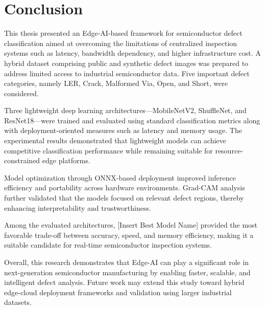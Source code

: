 \chapter{Conclusion}
This thesis presented an Edge-AI-based framework for semiconductor defect classification aimed at overcoming the limitations of centralized inspection systems such as latency, bandwidth dependency, and higher infrastructure cost. A hybrid dataset comprising public and synthetic defect images was prepared to address limited access to industrial semiconductor data. Five important defect categories, namely LER, Crack, Malformed Via, Open, and Short, were considered.

Three lightweight deep learning architectures—MobileNetV2, ShuffleNet, and ResNet18—were trained and evaluated using standard classification metrics along with deployment-oriented measures such as latency and memory usage. The experimental results demonstrated that lightweight models can achieve competitive classification performance while remaining suitable for resource-constrained edge platforms.

Model optimization through ONNX-based deployment improved inference efficiency and portability across hardware environments. Grad-CAM analysis further validated that the models focused on relevant defect regions, thereby enhancing interpretability and trustworthiness.

Among the evaluated architectures, [Insert Best Model Name] provided the most favorable trade-off between accuracy, speed, and memory efficiency, making it a suitable candidate for real-time semiconductor inspection systems.

Overall, this research demonstrates that Edge-AI can play a significant role in next-generation semiconductor manufacturing by enabling faster, scalable, and intelligent defect analysis. Future work may extend this study toward hybrid edge-cloud deployment frameworks and validation using larger industrial datasets.

